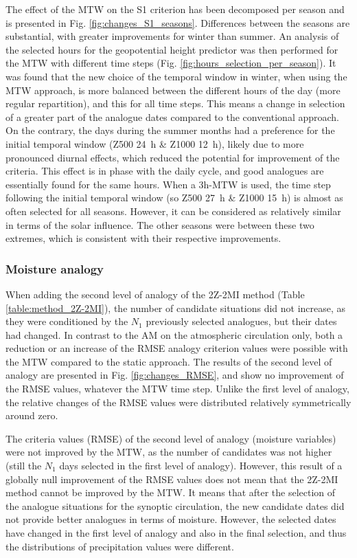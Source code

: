 \documentclass[hess, manuscript]{copernicus}
\begin{document}
	The effect of the MTW on the S1 criterion has been decomposed per season and is presented in Fig. \ref{fig:changes_S1_seasons}. Differences between the seasons are substantial, with greater improvements for winter than summer. An analysis of the selected hours for the geopotential height predictor was then performed for the MTW with different time steps (Fig. \ref{fig:hours_selection_per_season}). It was found that the new choice of the temporal window in winter, when using the MTW approach, is more balanced between the different hours of the day (more regular repartition), and this for all time steps. This means a change in selection of a greater part of the analogue dates compared to the conventional approach. On the contrary, the days during the summer months had a preference for the initial temporal window (Z500 24~h \& Z1000 12~h), likely due to more pronounced diurnal effects, which reduced the potential for improvement of the criteria. This effect is in phase with the daily cycle, and good analogues are essentially found for the same hours. When a 3h-MTW is used, the time step following the initial temporal window (so Z500 27~h \& Z1000 15~h) is almost as often selected for all seasons. However, it can be considered as relatively similar in terms of the solar influence. The other seasons were between these two extremes, which is consistent with their respective improvements.
	
	
	\subsubsection{Moisture analogy}
	\label{sec:changes_analogy_moisture}
	
	When adding the second level of analogy of the 2Z-2MI method (Table \ref{table:method_2Z-2MI}), the number of candidate situations did not increase, as they were conditioned by the $N_{1}$ previously selected analogues, but their dates had changed. In contrast to the AM on the atmospheric circulation only, both a reduction or an increase of the RMSE analogy criterion values were possible with the MTW compared to the static approach. The results of the second level of analogy are presented in Fig. \ref{fig:changes_RMSE}, and show no improvement of the RMSE values, whatever the MTW time step. Unlike the first level of analogy, the relative changes of the RMSE values were distributed relatively symmetrically around zero.
	
	The criteria values (RMSE) of the second level of analogy (moisture variables) were not improved by the MTW, as the number of candidates was not higher (still the $N_{1}$ days selected in the first level of analogy). However, this result of a globally null improvement of the RMSE values does not mean that the 2Z-2MI method cannot be improved by the MTW. It means that after the selection of the analogue situations for the synoptic circulation, the new candidate dates did not provide better analogues in terms of moisture. However, the selected dates have changed in the first level of analogy and also in the final selection, and thus the distributions of precipitation values were different.
	
\end{document}

